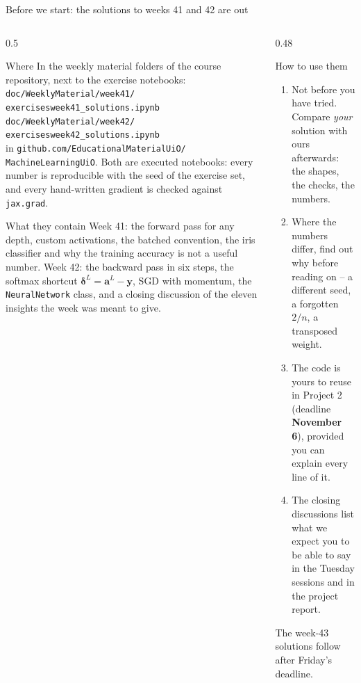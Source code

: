 \documentclass[10pt,aspectratio=169]{beamer}
\newcounter{insight}
\begin{document}
\begin{frame}{Before we start: the solutions to weeks 41 and 42 are out}
\small
\begin{columns}[T]
\begin{column}{0.5\textwidth}
\begin{block}{Where}
\footnotesize
In the weekly material folders of the course repository, next to the
exercise notebooks:
\texttt{doc/WeeklyMaterial/week41/}\\
\hspace*{1em}\texttt{exercisesweek41\_solutions.ipynb}\\
\texttt{doc/WeeklyMaterial/week42/}\\
\hspace*{1em}\texttt{exercisesweek42\_solutions.ipynb}\\
in \texttt{github.com/EducationalMaterialUiO/}\\
\hspace*{1em}\texttt{MachineLearningUiO}.
Both are executed notebooks: every number is reproducible with the seed of
the exercise set, and every hand-written gradient is checked against
\texttt{jax.grad}.
\end{block}
\begin{block}{What they contain}
\footnotesize
Week 41: the forward pass for any depth, custom activations, the batched
convention, the iris classifier and why the training accuracy is not a
useful number.  Week 42: the backward pass in six steps, the softmax
shortcut $\bm{\delta}^{L}=\bm{a}^{L}-\bm{y}$, SGD with momentum, the
\texttt{NeuralNetwork} class, and a closing discussion of the eleven
insights the week was meant to give.
\end{block}
\end{column}
\begin{column}{0.48\textwidth}
\begin{block}{How to use them}
\footnotesize
\begin{enumerate}
  \item Not before you have tried.  Compare \emph{your} solution with ours
        afterwards: the shapes, the checks, the numbers.
  \item Where the numbers differ, find out why before reading on -- a
        different seed, a forgotten $2/n$, a transposed weight.
  \item The code is yours to reuse in Project 2 (deadline
        \textbf{November 6}), provided you can explain every line of it.
  \item The closing discussions list what we expect you to be able to say in
        the Tuesday sessions and in the project report.
\end{enumerate}
The week-43 solutions follow after Friday's deadline.
\end{block}
\end{column}
\end{columns}
\end{frame}
\end{document}
